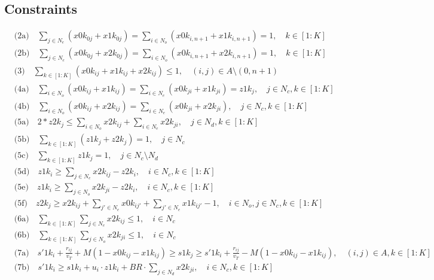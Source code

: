 \documentclass[11pt]{ctexart}
\begin{document}
\subsection*{Constraints}
\begin{align*}
&\text{(2a)} \quad \sum_{j \in N_e} (x0k_{0j} + x1k_{0j}) = \sum_{i \in N_o} (x0k_{i,n+1} + x1k_{i,n+1}) = 1, \quad k \in [1 : K] \\
&\text{(2b)} \quad \sum_{j \in N_e} (x0k_{0j} + x2k_{0j}) = \sum_{i \in N_o} (x0k_{i,n+1} + x2k_{i,n+1}) = 1, \quad k \in [1 : K] \\
&\text{(3)} \quad \sum_{k \in [1:K]} (x0k_{ij} + x1k_{ij} + x2k_{ij}) \leq 1, \quad (i, j) \in A \setminus (0, n + 1) \\
&\text{(4a)} \quad \sum_{i \in N_o} (x0k_{ij} + x1k_{ij}) = \sum_{i \in N_e} (x0k_{ji} + x1k_{ji}) = z1k_j, \quad j \in N_c, k \in [1 : K] \\
&\text{(4b)} \quad \sum_{i \in N_o} (x0k_{ij} + x2k_{ij}) = \sum_{i \in N_e} (x0k_{ji} + x2k_{ji}), \quad j \in N_c, k \in [1 : K] \\
&\text{(5a)} \quad 2 * z2k_j \leq \sum_{i \in N_o} x2k_{ij} + \sum_{i \in N_e} x2k_{ji}, \quad j \in N_d, k \in [1 : K] \\
&\text{(5b)} \quad \sum_{k \in [1:K]} (z1k_j + z2k_j) = 1, \quad j \in N_c \\
&\text{(5c)} \quad \sum_{k \in [1:K]} z1k_j = 1, \quad j \in N_c\setminus N_d \\
&\text{(5d)} \quad z1k_i \geq \sum_{j \in N_e} x2k_{ij} - z2k_i, \quad i \in N_c, k \in [1 : K] \\
&\text{(5e)} \quad z1k_i \geq \sum_{j \in N_o} x2k_{ji} - z2k_i, \quad i \in N_c, k \in [1 : K] \\
&\text{(5f)} \quad z2k_j \geq x2k_{ij} + \sum_{j' \in N_e} x0k_{ij'} + \sum_{j' \in N_e} x1k_{ij'} - 1, \quad i \in N_o, j \in N_c, k \in [1 : K] \\
&\text{(6a)} \quad \sum_{k \in [1:K]} \sum_{j \in N_e} x2k_{ij} \leq 1, \quad i \in N_c \\
&\text{(6b)} \quad \sum_{k \in [1:K]} \sum_{j \in N_o} x2k_{ji} \leq 1, \quad i \in N_c \\
&\text{(7a)} \quad s'1k_i + \frac{r_{ij}}{v_T} + M(1 - x0k_{ij} - x1k_{ij}) \geq s1k_j \geq s'1k_i + \frac{r_{ij}}{v_T} - M(1 - x0k_{ij} - x1k_{ij}), \quad (i, j) \in A, k \in [1 : K] \\
&\text{(7b)} \quad s'1k_i \geq s1k_i + u_i \cdot z1k_i + BR \cdot \sum_{j \in N_d} x2k_{ji}, \quad i \in N_c, k \in [1 : K] \\

\end{align*}
\end{document}
